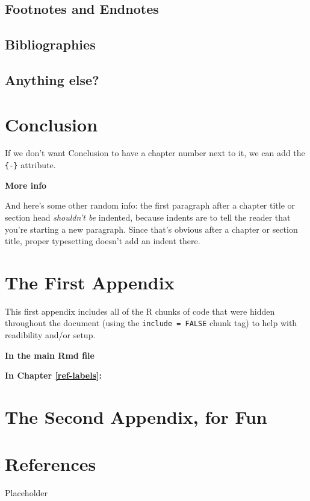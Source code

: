 \documentclass[12pt,twoside]{reedthesis}
\begin{document}
\hypertarget{footnotes-and-endnotes}{%
\section{Footnotes and Endnotes}\label{footnotes-and-endnotes}}

\hypertarget{bibliographies}{%
\section{Bibliographies}\label{bibliographies}}

\hypertarget{anything-else}{%
\section{Anything else?}\label{anything-else}}

\hypertarget{conclusion}{%
\chapter*{Conclusion}\label{conclusion}}

If we don't want Conclusion to have a chapter number next to it, we can add the \texttt{\{-\}} attribute.

\textbf{More info}

And here's some other random info: the first paragraph after a chapter title or section head \emph{shouldn't be} indented, because indents are to tell the reader that you're starting a new paragraph. Since that's obvious after a chapter or section title, proper typesetting doesn't add an indent there.

\appendix

\hypertarget{the-first-appendix}{%
\chapter{The First Appendix}\label{the-first-appendix}}

This first appendix includes all of the R chunks of code that were hidden throughout the document (using the \texttt{include\ =\ FALSE} chunk tag) to help with readibility and/or setup.

\textbf{In the main Rmd file}

\textbf{In Chapter \ref{ref-labels}:}

\hypertarget{the-second-appendix-for-fun}{%
\chapter{The Second Appendix, for Fun}\label{the-second-appendix-for-fun}}

\hypertarget{references}{%
\chapter*{References}\label{references}}

Placeholder


\end{document}
